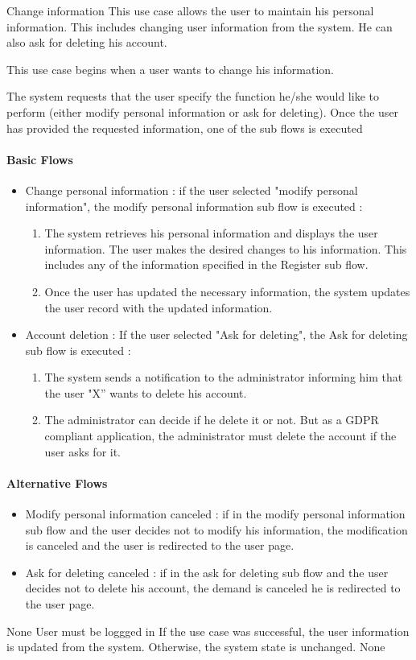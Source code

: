 \usecasedesc
{Change information}
{
  This use case allows the user to maintain his personal information. This includes changing user information from the system. He can also ask for deleting his account.
}
{
  This use case begins when a user wants to change his information.

  The system requests that the user specify the function he/she would like to perform (either modify personal information or ask for deleting). Once the user has provided the requested information, one of the sub flows is executed

  \paragraph{Basic Flows}
  \begin{itemize}
    \item Change personal information : if the user selected "modify personal information", the modify personal information sub flow is executed :
    \begin{enumerate}
      \item The system retrieves his personal information and displays the user information. The user makes the desired changes to his information. This includes any of the information specified in the Register sub flow.
      \item Once the user has updated the necessary information, the system updates the user record with the updated information.
    \end{enumerate}
    \item Account deletion : If the user selected "Ask for deleting", the Ask for deleting sub flow is executed :
    \begin{enumerate}
      \item The system sends a notification to the administrator informing him that the user "X” wants to delete his account.
      \item The administrator can decide if he delete it or not. But as a GDPR compliant application, the administrator must delete the account if the user asks for it.
    \end{enumerate}
  \end{itemize}

  \paragraph{Alternative Flows}
  \begin{itemize}
    \item Modify personal information canceled : if in the modify personal information sub flow and the user decides not to modify his information, the modification is canceled and the user is redirected to the user page.
    \item Ask for deleting canceled : if in the ask for deleting sub flow and the user decides not to delete his account, the demand is canceled he is redirected to the user page.
  \end{itemize}
}
{None}
{User must be loggged in}
{If the use case was successful, the user information is updated from the system.  Otherwise, the system state is unchanged.}
{None}


